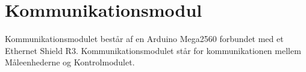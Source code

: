 
\section{Kommunikationsmodul}

Kommunikationsmodulet består af en Arduino Mega2560 forbundet med et Ethernet Shield R3. Kommunikationsmodulet står for kommunikationen mellem Måleenhederne og Kontrolmodulet. 